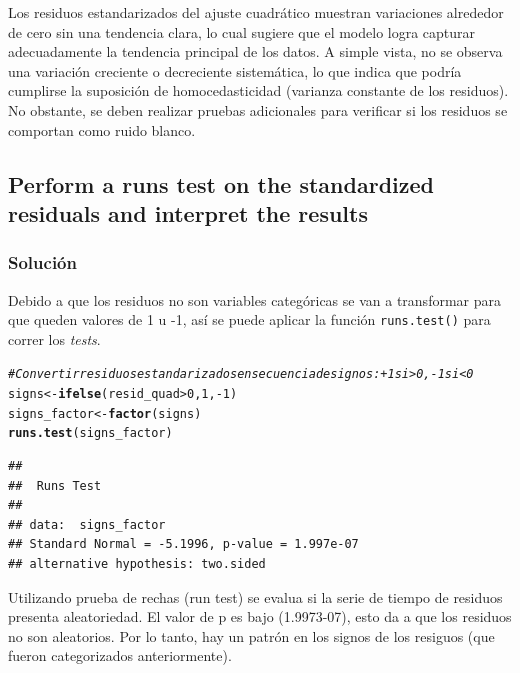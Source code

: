 \documentclass[12pt]{article}\usepackage[]{graphicx}\usepackage[]{xcolor}
\makeatletter
\newcommand{\hlnum}[1]{\textcolor[rgb]{0.686,0.059,0.569}{#1}}%
\newcommand{\hlcom}[1]{\textcolor[rgb]{0.678,0.584,0.686}{\textit{#1}}}%
\newcommand{\hlopt}[1]{\textcolor[rgb]{0,0,0}{#1}}%
\newcommand{\hldef}[1]{\textcolor[rgb]{0.345,0.345,0.345}{#1}}%
\newcommand{\hlkwb}[1]{\textcolor[rgb]{0.69,0.353,0.396}{#1}}%
\newcommand{\hlkwd}[1]{\textcolor[rgb]{0.737,0.353,0.396}{\textbf{#1}}}%
\newenvironment{kframe}{%
 \def\at@end@of@kframe{}%
 \ifinner\ifhmode%
  \def\at@end@of@kframe{\end{minipage}}%
  \begin{minipage}{\columnwidth}%
 \fi\fi%
 \def\FrameCommand##1{\hskip\@totalleftmargin \hskip-\fboxsep
 \colorbox{shadecolor}{##1}\hskip-\fboxsep
     \hskip-\linewidth \hskip-\@totalleftmargin \hskip\columnwidth}%
 \MakeFramed {\advance\hsize-\width
   \@totalleftmargin\z@ \linewidth\hsize
   \@setminipage}}%
 {\par\unskip\endMakeFramed%
 \at@end@of@kframe}
\newenvironment{knitrout}{}{} %
\makeatother
\begin{document}
Los residuos estandarizados del ajuste cuadrático muestran variaciones alrededor de cero sin una tendencia clara, lo cual sugiere que el modelo logra capturar adecuadamente la tendencia principal de los datos. A simple vista, no se observa una variación creciente o decreciente sistemática, lo que indica que podría cumplirse la suposición de homocedasticidad (varianza constante de los residuos). No obstante, se deben realizar pruebas adicionales para verificar si los residuos se comportan como ruido blanco.



\subsection{Perform a runs test on the standardized residuals and interpret the results}

\subsubsection{Solución}


Debido a que los residuos no son variables categóricas se van a transformar para que queden valores de 1 u -1, así se puede aplicar la función \lstinline|runs.test()| para correr los \textit{tests}.


\begin{knitrout}
\color{fgcolor}\begin{kframe}
\begin{alltt}
\hlcom{# Convertir residuos estandarizados en secuencia de signos: +1 si >0, -1 si <0}
\hldef{signs} \hlkwb{<-} \hlkwd{ifelse}\hldef{(resid_quad} \hlopt{>} \hlnum{0}\hldef{,} \hlnum{1}\hldef{,} \hlopt{-}\hlnum{1}\hldef{)}
\hldef{signs_factor} \hlkwb{<-} \hlkwd{factor}\hldef{(signs)}
\hlkwd{runs.test}\hldef{(signs_factor)}
\end{alltt}
\begin{verbatim}
## 
## 	Runs Test
## 
## data:  signs_factor
## Standard Normal = -5.1996, p-value = 1.997e-07
## alternative hypothesis: two.sided
\end{verbatim}
\end{kframe}
\end{knitrout}

Utilizando prueba de rechas (run test) se evalua si la serie de tiempo de residuos presenta aleatoriedad. El valor de p es bajo (1.9973-07), esto da a que los residuos no son aleatorios. Por lo tanto, hay un patrón en los signos de los resiguos (que fueron categorizados anteriormente).
\end{document}
